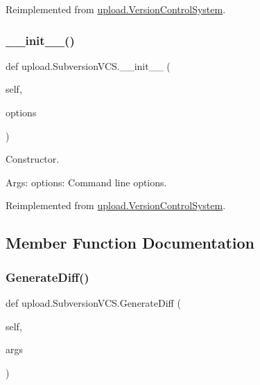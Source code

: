 Reimplemented from \mbox{\hyperlink{classupload_1_1VersionControlSystem_ace97e5785a2b40011404ae6fbb956ecf}{upload.\+Version\+Control\+System}}.

\mbox{\label{classupload_1_1SubversionVCS_a8333f94e27335ce83eed0cc3f5a1eeb0}} 
\subsubsection{\texorpdfstring{\_\_init\_\_()}{\_\_init\_\_()}\hspace{0.1cm}{\footnotesize\ttfamily [2/2]}}
{\footnotesize\ttfamily def upload.\+Subversion\+V\+C\+S.\+\_\+\+\_\+init\+\_\+\+\_\+ (\begin{DoxyParamCaption}\item[{}]{self,  }\item[{}]{options }\end{DoxyParamCaption})}

\begin{DoxyVerb}Constructor.

Args:
  options: Command line options.
\end{DoxyVerb}
 

Reimplemented from \mbox{\hyperlink{classupload_1_1VersionControlSystem_ace97e5785a2b40011404ae6fbb956ecf}{upload.\+Version\+Control\+System}}.



\subsection{Member Function Documentation}
\mbox{\label{classupload_1_1SubversionVCS_a07c2d341f2c7df2772dd7f85e89b0212}} 
\subsubsection{\texorpdfstring{GenerateDiff()}{GenerateDiff()}\hspace{0.1cm}{\footnotesize\ttfamily [1/2]}}
{\footnotesize\ttfamily def upload.\+Subversion\+V\+C\+S.\+Generate\+Diff (\begin{DoxyParamCaption}\item[{}]{self,  }\item[{}]{args }\end{DoxyParamCaption})}

